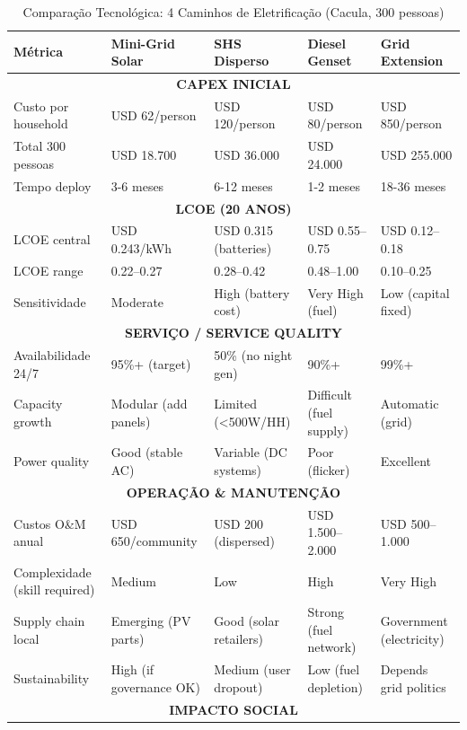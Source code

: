 \documentclass[12pt, a4paper]{article}
\begin{document}
\begin{table}[H]
\centering
\caption{Comparação Tecnológica: 4 Caminhos de Eletrificação (Cacula, 300 pessoas)}
\label{tab:tech_comparison}
\small
\begin{tabular}{|l|l|l|l|l|}
\hline
\textbf{Métrica} & \textbf{Mini-Grid Solar} & \textbf{SHS Disperso} & \textbf{Diesel Genset} & \textbf{Grid Extension} \\
\hline
\multicolumn{5}{|c|}{\textbf{CAPEX INICIAL}} \\
\hline
Custo por household & USD 62/person & USD 120/person & USD 80/person & USD 850/person \\
Total 300 pessoas & USD 18.700 & USD 36.000 & USD 24.000 & USD 255.000 \\
Tempo deploy & 3-6 meses & 6-12 meses & 1-2 meses & 18-36 meses \\
\hline
\multicolumn{5}{|c|}{\textbf{LCOE (20 ANOS)}} \\
\hline
LCOE central & USD 0.243/kWh & USD 0.315 (batteries) & USD 0.55–0.75 & USD 0.12–0.18 \\
LCOE range & 0.22–0.27 & 0.28–0.42 & 0.48–1.00 & 0.10–0.25 \\
Sensitividade & Moderate & High (battery cost) & Very High (fuel) & Low (capital fixed) \\
\hline
\multicolumn{5}{|c|}{\textbf{SERVIÇO / SERVICE QUALITY}} \\
\hline
Availabilidade 24/7 & 95\%+ (target) & 50\% (no night gen) & 90\%+ & 99\%+ \\
Capacity growth & Modular (add panels) & Limited (<500W/HH) & Difficult (fuel supply) & Automatic (grid) \\
Power quality & Good (stable AC) & Variable (DC systems) & Poor (flicker) & Excellent \\
\hline
\multicolumn{5}{|c|}{\textbf{OPERAÇÃO \& MANUTENÇÃO}} \\
\hline
Custos O\&M anual & USD 650/community & USD 200 (dispersed) & USD 1.500–2.000 & USD 500–1.000 \\
Complexidade (skill required) & Medium & Low & High & Very High \\
Supply chain local & Emerging (PV parts) & Good (solar retailers) & Strong (fuel network) & Government (electricity) \\
Sustainability & High (if governance OK) & Medium (user dropout) & Low (fuel depletion) & Depends grid politics \\
\hline
\multicolumn{5}{|c|}{\textbf{IMPACTO SOCIAL}} \\

\end{tabular}
\end{table}
\end{document}
